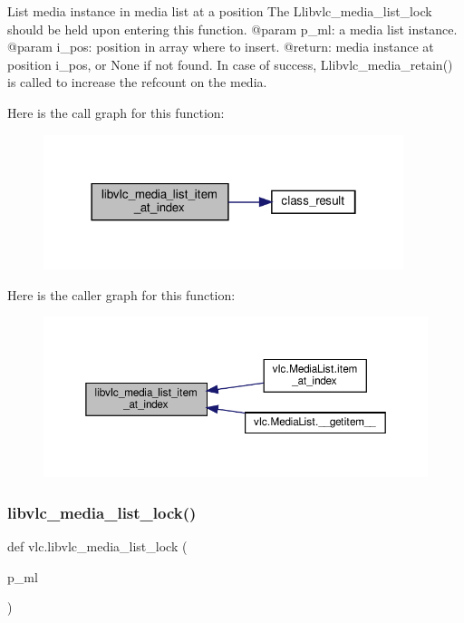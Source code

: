 \begin{DoxyVerb}List media instance in media list at a position
The L{libvlc_media_list_lock} should be held upon entering this function.
@param p_ml: a media list instance.
@param i_pos: position in array where to insert.
@return: media instance at position i_pos, or None if not found. In case of success, L{libvlc_media_retain}() is called to increase the refcount on the media.
\end{DoxyVerb}
 Here is the call graph for this function\+:
\nopagebreak
\begin{figure}[H]
\begin{center}
\leavevmode
\includegraphics[width=298pt]{namespacevlc_a80caa9f399a4da1b6c5fd68173fc867b_cgraph}
\end{center}
\end{figure}
Here is the caller graph for this function\+:
\nopagebreak
\begin{figure}[H]
\begin{center}
\leavevmode
\includegraphics[width=350pt]{namespacevlc_a80caa9f399a4da1b6c5fd68173fc867b_icgraph}
\end{center}
\end{figure}
\mbox{\label{namespacevlc_aec544fc1d8f2faa7ec426291fe7cd3da}} 
\subsubsection{\texorpdfstring{libvlc\+\_\+media\+\_\+list\+\_\+lock()}{libvlc\_media\_list\_lock()}}
{\footnotesize\ttfamily def vlc.\+libvlc\+\_\+media\+\_\+list\+\_\+lock (\begin{DoxyParamCaption}\item[{}]{p\+\_\+ml }\end{DoxyParamCaption})}

